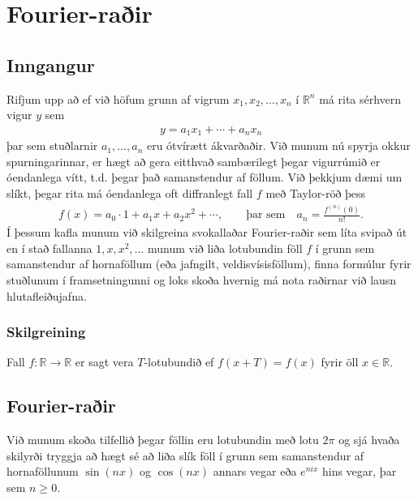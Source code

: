 \documentclass[a4paper,10pt,icelandic]{sphinxmanual}
\begin{document}
\chapter{Fourier-raðir}
\label{\detokenize{Kafli02:fourier-rair}}\label{\detokenize{Kafli02::doc}}

\section{Inngangur}
\label{\detokenize{Kafli02:inngangur}}
Rifjum upp að ef við höfum grunn af vigrum \(x_1,x_2,\ldots,x_n\) í \(\mathbb{R}^n\) má rita sérhvern vigur \(y\) sem
\begin{equation*}
\begin{split}y = a_1 x_1 + \cdots + a_n x_n\end{split}
\end{equation*}
þar sem stuðlarnir \(a_1,\ldots,a_n\) eru ótvírætt ákvarðaðir. Við munum nú spyrja okkur spurningarinnar, er hægt að gera eitthvað sambærilegt þegar vigurrúmið er óendanlega vítt, t.d. þegar það samanstendur af föllum. Við þekkjum dæmi um slíkt, þegar rita má óendanlega oft diffranlegt fall \(f\) með Taylor-röð þess
\begin{equation*}
\begin{split}f(x) = a_0\cdot 1 + a_1 x + a_2 x^2 + \cdots, \qquad \text{þar sem} \quad a_n = \frac{f^{(n)}(0)}{n!}.\end{split}
\end{equation*}
Í þessum kafla munum við skilgreina svokallaðar Fourier-raðir sem líta svipað út en í stað fallanna \(1,x,x^2,\ldots\) munum við liða lotubundin föll \(f\) í grunn sem samanstendur af hornaföllum (eða jafngilt, veldisvísisföllum), finna formúlur fyrir stuðlunum í framsetningunni og loks skoða hvernig má nota raðirnar við lausn hlutafleiðujafna.


\subsection{Skilgreining}
\label{\detokenize{Kafli02:skilgreining}}
Fall \(f: \mathbb{R}\to \mathbb{R}\) er sagt vera \(T\)-lotubundið ef \(f(x+T) = f(x)\) fyrir öll \(x\in\mathbb{R}\).


\section{Fourier-raðir}
\label{\detokenize{Kafli02:id1}}
Við munum skoða tilfellið þegar föllin eru lotubundin með lotu \(2\pi\) og sjá hvaða skilyrði tryggja að hægt sé að liða slík föll í grunn sem samanstendur af hornaföllunum \(\sin(nx)\) og \(\cos(nx)\) annars vegar eða \(e^{nix}\) hins vegar, þar sem \(n\geq 0\).
\end{document}
